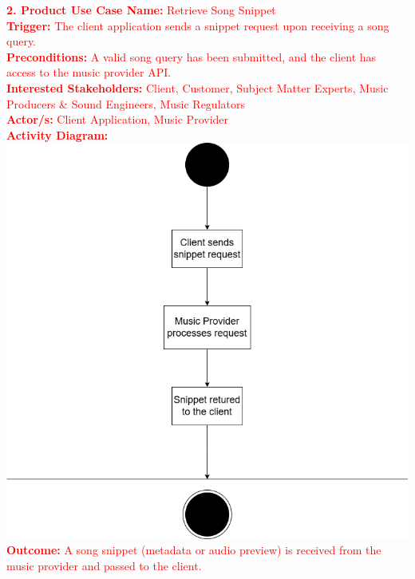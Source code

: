 \documentclass[12pt]{article}
\begin{document}
\vspace{1cm}

\noindent\textcolor{red}{\textbf{2. Product Use Case Name:} Retrieve Song Snippet} \\
\textcolor{red}{\textbf{Trigger:} The client application sends a snippet request upon receiving a song query.} \\
\textcolor{red}{\textbf{Preconditions:} A valid song query has been submitted, and the client has access to the music provider API.} \\
\textcolor{red}{\textbf{Interested Stakeholders:} Client, Customer, Subject Matter Experts, Music Producers \& Sound Engineers, Music Regulators} \\
\textcolor{red}{\textbf{Actor/s:} Client Application, Music Provider} \\
\textcolor{red}{\textbf{Activity Diagram:}} \\
\includegraphics[width=\textwidth]{PUC2.drawio.png}
\textcolor{red}{\textbf{Outcome:} A song snippet (metadata or audio preview) is received from the music provider and passed to the client.} \\

\vspace{1cm}
\end{document}

